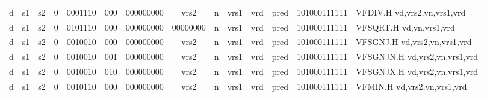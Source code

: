 \begin{landscape}
\begin{table}[p]
\begin{small}
\begin{center}
\begin{tabular}{p{0.08in}@{}p{0.08in}@{}p{0.08in}@{}p{0.08in}@{}p{0.50in}@{}p{0.30in}@{}p{0.08in}@{}p{0.8in}@{}p{0.48in}@{}p{0.32in}@{}p{0.08in}@{}p{0.8in}@{}p{0.8in}@{}p{0.4in}@{}p{0.56in}l}
\multicolumn{1}{|c|}{d} &
\multicolumn{1}{c|}{s1} &
\multicolumn{1}{c|}{s2} &
\multicolumn{1}{c|}{0} &
\multicolumn{1}{c|}{0001110} &
\multicolumn{1}{c|}{000} &
\multicolumn{2}{c|}{000000000} &
\multicolumn{2}{c|}{vrs2} &
\multicolumn{1}{c|}{n} &
\multicolumn{1}{c|}{vrs1} &
\multicolumn{1}{c|}{vrd} &
\multicolumn{1}{c|}{pred} &
\multicolumn{1}{c|}{101000111111} & VFDIV.H vd,vrs2,vn,vrs1,vrd \\
\cline{1-15}
  

\multicolumn{1}{|c|}{d} &
\multicolumn{1}{c|}{s1} &
\multicolumn{1}{c|}{s2} &
\multicolumn{1}{c|}{0} &
\multicolumn{1}{c|}{0101110} &
\multicolumn{1}{c|}{000} &
\multicolumn{2}{c|}{000000000} &
\multicolumn{2}{c|}{00000000} &
\multicolumn{1}{c|}{n} &
\multicolumn{1}{c|}{vrs1} &
\multicolumn{1}{c|}{vrd} &
\multicolumn{1}{c|}{pred} &
\multicolumn{1}{c|}{101000111111} & VFSQRT.H vd,vn,vrs1,vrd \\
\cline{1-15}
  

\multicolumn{1}{|c|}{d} &
\multicolumn{1}{c|}{s1} &
\multicolumn{1}{c|}{s2} &
\multicolumn{1}{c|}{0} &
\multicolumn{1}{c|}{0010010} &
\multicolumn{1}{c|}{000} &
\multicolumn{2}{c|}{000000000} &
\multicolumn{2}{c|}{vrs2} &
\multicolumn{1}{c|}{n} &
\multicolumn{1}{c|}{vrs1} &
\multicolumn{1}{c|}{vrd} &
\multicolumn{1}{c|}{pred} &
\multicolumn{1}{c|}{101000111111} & VFSGNJ.H vd,vrs2,vn,vrs1,vrd \\
\cline{1-15}
  

\multicolumn{1}{|c|}{d} &
\multicolumn{1}{c|}{s1} &
\multicolumn{1}{c|}{s2} &
\multicolumn{1}{c|}{0} &
\multicolumn{1}{c|}{0010010} &
\multicolumn{1}{c|}{001} &
\multicolumn{2}{c|}{000000000} &
\multicolumn{2}{c|}{vrs2} &
\multicolumn{1}{c|}{n} &
\multicolumn{1}{c|}{vrs1} &
\multicolumn{1}{c|}{vrd} &
\multicolumn{1}{c|}{pred} &
\multicolumn{1}{c|}{101000111111} & VFSGNJN.H vd,vrs2,vn,vrs1,vrd \\
\cline{1-15}
  

\multicolumn{1}{|c|}{d} &
\multicolumn{1}{c|}{s1} &
\multicolumn{1}{c|}{s2} &
\multicolumn{1}{c|}{0} &
\multicolumn{1}{c|}{0010010} &
\multicolumn{1}{c|}{010} &
\multicolumn{2}{c|}{000000000} &
\multicolumn{2}{c|}{vrs2} &
\multicolumn{1}{c|}{n} &
\multicolumn{1}{c|}{vrs1} &
\multicolumn{1}{c|}{vrd} &
\multicolumn{1}{c|}{pred} &
\multicolumn{1}{c|}{101000111111} & VFSGNJX.H vd,vrs2,vn,vrs1,vrd \\
\cline{1-15}
  

\multicolumn{1}{|c|}{d} &
\multicolumn{1}{c|}{s1} &
\multicolumn{1}{c|}{s2} &
\multicolumn{1}{c|}{0} &
\multicolumn{1}{c|}{0010110} &
\multicolumn{1}{c|}{000} &
\multicolumn{2}{c|}{000000000} &
\multicolumn{2}{c|}{vrs2} &
\multicolumn{1}{c|}{n} &
\multicolumn{1}{c|}{vrs1} &
\multicolumn{1}{c|}{vrd} &
\multicolumn{1}{c|}{pred} &
\multicolumn{1}{c|}{101000111111} & VFMIN.H vd,vrs2,vn,vrs1,vrd \\
\cline{1-15}
  


\end{tabular}
\end{center}
\end{small}
\end{table}
\end{landscape}
